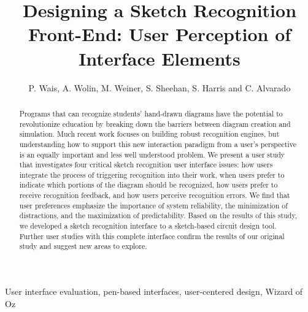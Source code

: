 \documentclass{elsart}
\begin{document}
\begin{frontmatter}
\title{Designing a Sketch Recognition Front-End: User Perception of
Interface Elements}

\author{P. Wais, A. Wolin, M. Weiner, S. Sheehan, S.
Harris and C. Alvarado} \address{Department of Computer
Science, Harvey Mudd College, Claremont, CA}


\begin{abstract}
   Programs that can recognize students' hand-drawn diagrams have the
   potential to revolutionize education by breaking down the barriers
   between diagram creation and simulation.  Much recent work focuses
   on building robust recognition engines, but understanding how to
   support this new interaction paradigm from a user's perspective is
   an equally important and less well understood problem.  We present
   a user study that investigates four critical sketch recognition
   user interface issues: how users integrate the process of
   triggering recognition into their work, when users prefer to
   indicate which portions of the diagram should be recognized, how
   users prefer to receive recognition feedback, and how users
   perceive recognition errors.  We find that user preferences
   emphasize the importance of system reliability, the minimization of
   distractions, and the maximization of predictability. Based on the
   results of this study, we developed a sketch recognition interface
   to a sketch-based circuit design tool.  Further user studies with
   this complete interface confirm the results of our original
   study and suggest new areas to explore.
\end{abstract}

\begin{keyword}
User interface evaluation, pen-based interfaces, user-centered
design, Wizard of Oz
\end{keyword}
\end{frontmatter}

   
\end{document}
